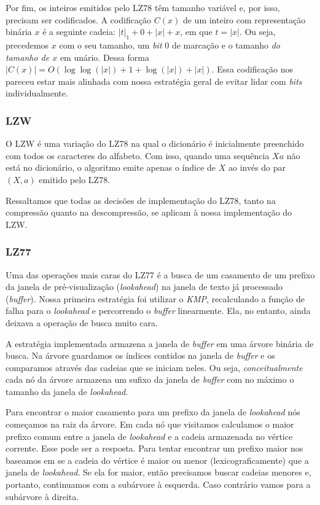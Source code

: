 \documentclass[]{article}
\begin{document}
Por fim, os inteiros emitidos pelo LZ78 têm tamanho variável e, por isso, precisam ser codificados. A codificação $C(x)$ de um inteiro com representação binária $x$ é a seguinte cadeia: $|t|_1 + 0 + |x| + x$, em que $t = |x|$. Ou seja, precedemos $x$ com o seu tamanho, um \textit{bit} 0 de marcação e o tamanho \textit{do tamanho de $x$} em unário. Dessa forma $|C(x)| = O(\log\log(|x|) + 1 + \log(|x|) + |x|)$. Essa codificação nos pareceu estar mais alinhada com nossa estratégia geral de evitar lidar com \textit{bits} individualmente.

\subsubsection{LZW}

O LZW é uma variação do LZ78 na qual o dicionário é inicialmente preenchido com todos os caracteres do alfabeto. Com isso, quando uma sequência $Xa$ não está no dicionário, o algoritmo emite apenas o índice de $X$ ao invés do par $(X,a)$ emitido pelo LZ78.

Ressaltamos que todas as decisões de implementação do LZ78, tanto na compressão quanto na descompressão, se aplicam à nossa implementação do LZW.

\subsubsection{LZ77}

Uma das operações mais caras do LZ77 é a busca de um casamento de um prefixo da janela de pré-visualização (\textit{lookahead}) na janela de texto já processado (\textit{buffer}). Nossa primeira estratégia foi utilizar o \textit{KMP}, recalculando a função de falha para o \textit{lookahead} e percorrendo o \textit{buffer} linearmente. Ela, no entanto, ainda deixava a operação de busca muito cara.

A estratégia implementada armazena a janela de \textit{buffer} em uma árvore binária de busca. Na árvore guardamos os índices contidos na janela de \textit{buffer} e os comparamos através das cadeias que se iniciam neles. Ou seja, \textit{conceitualmente} cada nó da árvore armazena um sufixo da janela de \textit{buffer} com no máximo o tamanho da janela de \textit{lookahead}. 

Para encontrar o maior casamento para um prefixo da janela de \textit{lookahead} nós começamos na raiz da árvore. Em cada nó que visitamos calculamos o maior prefixo comum entre a janela de \textit{lookahead} e a cadeia armazenada no vértice corrente. Esse pode ser a resposta. Para tentar encontrar um prefixo maior nos baseamos em se a cadeia do vértice é maior ou menor (lexicograficamente) que a janela de \textit{lookahead}. Se ela for maior, então precisamos buscar cadeias menores e, portanto, continuamos com a subárvore à esquerda. Caso contrário vamos para a subárvore à direita.
\end{document}
